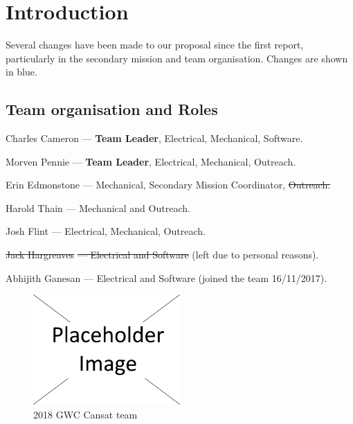 \documentclass{report}
\begin{document}
\begin{description}
	\end{description}

	\chapter{Introduction}
	Several changes have been made to our proposal since the first report, 
	particularly in the secondary mission and team organisation. 
	Changes are shown in blue.
	\section{Team organisation and Roles}
		\begin{description}
			\item{Charles Cameron} --- \textbf{Team Leader}, Electrical, 
			Mechanical, Software.
			\item{Morven Pennie} --- \textbf{Team Leader}, Electrical,
			Mechanical, Outreach.
			\item{Erin Edmonstone} --- Mechanical, 
			{\color{blue}Secondary Mission Coordinator, \sout{Outreach.}}
			\item{Harold Thain} --- Mechanical and Outreach.
			\item{Josh Flint} --- Electrical, Mechanical, Outreach.
			\color{blue}
			\item{\sout{Jack Hargreaves}}\sout{ --- Electrical and Software} (left
			due to personal reasons).
			\item{Abhijith Ganesan} --- Electrical and Software (joined the team 
			16/11/2017).
	 	\end{description}

		\begin{figure}[H]
			\begin{center}
				\includegraphics[width=0.5\textwidth]{placeholder}
			\end{center}
			\vspace{-15pt}
			\caption{2018 GWC Cansat team}
		\end{figure}
\end{document}
